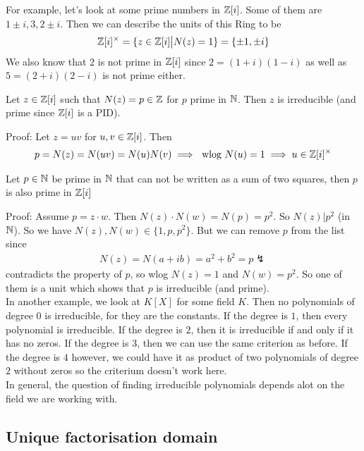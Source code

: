 For example, let's look at some prime numbers in $\mathbb{Z}[i]$. Some of them are $1 \pm i, 3, 2 \pm i$. Then we can describe the units of this Ring to be
\begin{align*}
	\mathbb{Z}[i]^{\times} = \{z \in \mathbb{Z}[i]\big\vert N(z) = 1\} = \{\pm 1, \pm i\}
\end{align*}
We also know that $2$ is not prime in $\mathbb{Z}[i]$ since $2 = (1+i)(1 -i)$ as well as $5 = (2+i)(2-i)$ is not prime either.


\begin{lemma}[]
	Let $z \in \mathbb{Z}[i]$ such that $N(z) = p \in \mathbb{Z}$ for $p$ prime in $\mathbb{N}$. Then $z$ is irreducible (and prime since $\mathbb{Z}[i]$ is a PID).
\end{lemma}
Proof: Let $z = uv$ for $u,v \in \mathbb{Z}[i]$. Then 
\begin{align*}
	p = N(z) = N(uv) = N(u)N(v) \implies \text{ wlog } N(u) = 1 \implies u \in \mathbb{Z}[i]^{\times}
\end{align*}

\begin{lemma}[]
	Let $p \in \mathbb{N}$ be prime in $\mathbb{N}$ that can not be written as a sum of two squares, then $p$ is also prime in $\mathbb{Z}[i]$
\end{lemma}
Proof: Assume $p = z \cdot w$. Then $N(z) \cdot N(w) = N(p) = p^2$. So $N(z) | p^2$ (in $\mathbb{N}$). So we have $N(z), N(w) \in \{1,p,p^2\}$. But we can remove $p$ from the list since
\begin{align*}
	N(z) = N(a + ib) = a^2 + b^2 = p \lightning
\end{align*}
contradicts the property of $p$, so wlog $N(z) = 1$ and $N(w) = p^2$. So one of them is a unit which shows that $p$ is irreducible (and prime).\\

In another example, we look at $K[X]$ for some field $K$. Then no polynomials of degree $0$ is irreducible, for they are the constants. If the degree is $1$, then every polynomial is irreducible. 
If the degree is $2$, then it is irreducible if and only if it has no zeros. If the degree is $3$, then we can use the same criterion as before. If the degree is $4$ however, we could have it as product of two polynomials of degree $2$ without zeros so the criterium doesn't work here.\\

In general, the question of finding irreducible polynomials depends alot on the field we are working with.\\


\subsection{Unique factorisation domain}


